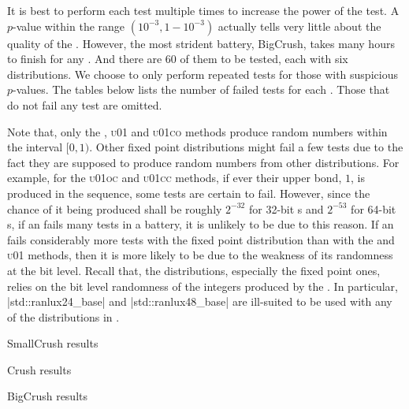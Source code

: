 It is best to perform each test multiple times to increase the power of the
test. A $p$-value within the range $(10^{-3}, 1 - 10^{-3})$ actually tells very
little about the quality of the \rng. However, the most strident battery,
BigCrush, takes many hours to finish for any \rng. And there are 60 of them to
be tested, each with six distributions. We choose to only perform repeated
tests for those with suspicious $p$-values. The tables below lists the number
of failed tests for each \rng. Those that do not fail any test are omitted.

Note that, only the \std, \textsc{u01} and \textsc{u01co} methods produce
random numbers within the interval $[0, 1)$. Other fixed point distributions
might fail a few tests due to the fact they are supposed to produce random
numbers from other distributions. For example, for the \textsc{u01oc} and
\textsc{u01cc} methods, if ever their upper bond, $1$, is produced in the
sequence, some tests are certain to fail. However, since the chance of it being
produced shall be roughly $2^{-32}$ for 32-bit \rng{}s and $2^{-53}$ for 64-bit
\rng{}s, if an \rng fails many tests in a battery, it is unlikely to be due to
this reason. If an \rng fails considerably more tests with the fixed point
distribution than with the \std and \textsc{u01} methods, then it is more
likely to be due to the weakness of its randomness at the bit level. Recall
that, the \mckl distributions, especially the fixed point ones, relies on the
bit level randomness of the integers produced by the \rng. In particular,
|std::ranlux24_base| and |std::ranlux48_base| are ill-suited to be used with
any of the distributions in \mckl.

\newpage

\begin{table}
  \caption{\testu SmallCrush results}
  \label{tab:TestU01 SmallCrush results}
\end{table}

\begin{table}
  \caption{\testu Crush results}
  \label{tab:TestU01 Crush results}
\end{table}

\begin{table}
  \caption{\testu BigCrush results}
  \label{tab:TestU01 BigCrush results}
\end{table}
